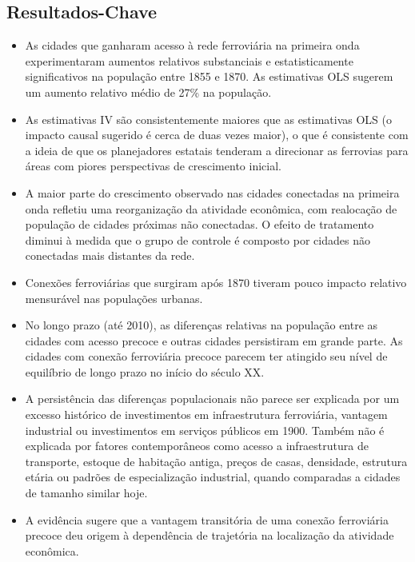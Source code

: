 \documentclass[12pt]{article}
\begin{document}
\subsection*{Resultados-Chave}
\begin{itemize}
    \item As cidades que ganharam acesso à rede ferroviária na primeira onda experimentaram aumentos relativos substanciais e estatisticamente significativos na população entre 1855 e 1870. As estimativas OLS sugerem um aumento relativo médio de 27\% na população.
    \item As estimativas IV são consistentemente maiores que as estimativas OLS (o impacto causal sugerido é cerca de duas vezes maior), o que é consistente com a ideia de que os planejadores estatais tenderam a direcionar as ferrovias para áreas com piores perspectivas de crescimento inicial.
    \item A maior parte do crescimento observado nas cidades conectadas na primeira onda refletiu uma reorganização da atividade econômica, com realocação de população de cidades próximas não conectadas. O efeito de tratamento diminui à medida que o grupo de controle é composto por cidades não conectadas mais distantes da rede.
    \item Conexões ferroviárias que surgiram após 1870 tiveram pouco impacto relativo mensurável nas populações urbanas.
    \item No longo prazo (até 2010), as diferenças relativas na população entre as cidades com acesso precoce e outras cidades persistiram em grande parte. As cidades com conexão ferroviária precoce parecem ter atingido seu nível de equilíbrio de longo prazo no início do século XX.
    \item A persistência das diferenças populacionais não parece ser explicada por um excesso histórico de investimentos em infraestrutura ferroviária, vantagem industrial ou investimentos em serviços públicos em 1900. Também não é explicada por fatores contemporâneos como acesso a infraestrutura de transporte, estoque de habitação antiga, preços de casas, densidade, estrutura etária ou padrões de especialização industrial, quando comparadas a cidades de tamanho similar hoje.
    \item A evidência sugere que a vantagem transitória de uma conexão ferroviária precoce deu origem à dependência de trajetória na localização da atividade econômica.
\end{itemize}
\end{document}
